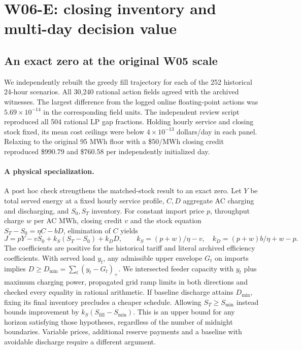 \documentclass[10pt,letterpaper]{article}
\begin{document}
\section{W06-E: closing inventory and multi-day decision value}
\label{sec:w06e}
\subsection{An exact zero at the original W05 scale}
We independently rebuilt the greedy fill trajectory for each of the 252 historical 24-hour scenarios. All 30,240 rational action fields agreed with the archived witnesses. The largest difference from the logged online floating-point actions was $5.69\times10^{-14}$ in the corresponding field units. The independent review script reproduced all 504 rational LP gap fractions. Holding hourly service and closing stock fixed, its mean cost ceilings were below $4\times 10^{-13}$ dollars/day in each panel. Relaxing to the original 95 MWh floor with a \$50/MWh closing credit reproduced \$990.79 and \$760.58 per independently initialized day.

\paragraph{A physical specialization.}
A post hoc check strengthens the matched-stock result to an exact zero. Let $Y$ be total served energy at a fixed hourly service profile, $C,D$ aggregate AC charging and discharging, and $S_0,S_T$ inventory. For constant import price $p$, throughput charge $w$ per AC MWh, closing credit $v$ and the stock equation $S_T-S_0=\eta C-bD$, elimination of $C$ yields
\[
 J=pY-vS_0+k_S(S_T-S_0)+k_DD,\qquad
 k_S=(p+w)/\eta-v,\quad k_D=(p+w)b/\eta+w-p .
\]
The coefficients are positive for the historical tariff and literal archived efficiency coefficients. With served load $y_t$, any admissible upper envelope $G_t$ on imports implies $D\geq D_{\min}=\sum_t (y_t-G_t)_+$. We intersected feeder capacity with $y_t$ plus maximum charging power, propagated grid ramp limits in both directions and checked every equality in rational arithmetic. If baseline discharge attains $D_{\min}$, fixing its final inventory precludes a cheaper schedule. Allowing $S_T\geq S_{\min}$ instead bounds improvement by $k_S(S_{\mathrm{fill}}-S_{\min})$. This is an upper bound for any horizon satisfying those hypotheses, regardless of the number of midnight boundaries. Variable prices, additional reserve payments and a baseline with avoidable discharge require a different argument.
\end{document}
